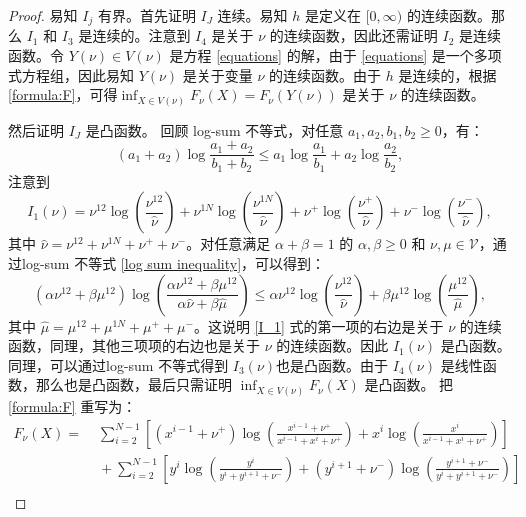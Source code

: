 \begin{proof}
	易知 $I_j$ 有界。首先证明 $I_J$ 连续。易知 $h$ 是定义在 $[0,\infty)$ 的连续函数。那么 $I_1$ 和 $I_3$ 是连续的。注意到  $I_4$ 是关于 $\nu$ 的连续函数，因此还需证明 $I_2$ 是连续函数。令 $Y(\nu)\in V(\nu)$ 是方程 \eqref{equations} 的解，由于 \eqref{equations} 是一个多项式方程组，因此易知 $Y(\nu)$ 是关于变量 $\nu$ 的连续函数。由于 $h$ 是连续的，根据 \eqref{formula:F}，可得$\inf_{X\in V(\nu)}F_{\nu}(X)=F_{\nu}(Y(\nu))$ 是关于 $\nu$ 的连续函数。
	
	然后证明 $I_J$ 是凸函数。 回顾 log-sum 不等式，对任意 $a_{1},a_{2},b_{1},b_{2}\ge 0$，有：
	\begin{equation}\label{log sum inequality}
		(a_1+a_2)\log \frac{a_1+a_2}{b_1+b_2}\le a_{1}\log \frac{a_{1}}{b_{1}}+a_{2}\log \frac{a_{2}}{b_{2}} ,
	\end{equation}
	注意到
	\begin{equation}\label{I_1}
		I_1(\nu) = \nu^{12}\log\left(\frac{\nu^{12}}{\hat{\nu}}\right)+\nu^{1N}\log\left(\frac{\nu^{1N}}{\hat{\nu}}\right)+\nu^{+}\log\left(\frac{\nu^{+}}{\hat{\nu}}\right)+\nu^{-}\log\left(\frac{\nu^{-}}{\hat{\nu}}\right),
	\end{equation}
	其中 $\hat{\nu}=\nu^{12}+\nu^{1N}+\nu^++\nu^-$。对任意满足 $\alpha+\beta=1$ 的 $\alpha,\beta\ge 0$ 和 $\nu,\mu\in \mathcal{V}$，通过log-sum 不等式 \eqref{log sum inequality}，可以得到：
	\begin{equation*}
		(\alpha \nu^{12}+\beta \mu^{12})\log\left(\frac{\alpha \nu^{12}+\beta \mu^{12}}{\alpha \hat{\nu}+\beta \hat{\mu}}\right)\le \alpha\nu^{12}\log\left(\frac{\nu^{12}}{\hat{\nu}}\right)+\beta\mu^{12}\log\left(\frac{\mu^{12}}{\hat{\mu}}\right),
	\end{equation*}
	其中 $\hat{\mu}=\mu^{12}+\mu^{1N}+\mu^++\mu^-$。这说明 \eqref{I_1} 式的第一项的右边是关于 $\nu$ 的连续函数，同理，其他三项项的右边也是关于 $\nu$ 的连续函数。因此 $I_1(\nu)$ 是凸函数。同理，可以通过log-sum 不等式得到 $I_3(\nu)$也是凸函数。由于 $I_4(\nu)$ 是线性函数，那么也是凸函数，最后只需证明 $\inf_{X\in V(\nu)}F_{\nu}(X)$ 是凸函数。 把\eqref{formula:F} 重写为：
	\begin{align*}
		F_{\nu}(X)=&\;\sum_{i=2}^{N-1}\left[(x^{i-1}+\nu^+)\log\left(\frac{x^{i-1}+\nu^+}{x^{i-1}+x^i+\nu^+}\right)+x^i\log\left(\frac{x^{i}}{x^{i-1}+x^i+\nu^+}\right)\right]\\
		&\;+\sum_{i=2}^{N-1}\left[y^i\log\left(\frac{y^{i}}{y^{i}+y^{i+1}+\nu^-}\right)+(y^{i+1}+\nu^-)\log\left(\frac{y^{i+1}+\nu^-}{y^{i}+y^{i+1}+\nu^-}\right)\right]\\

\end{align*}
\end{proof}
